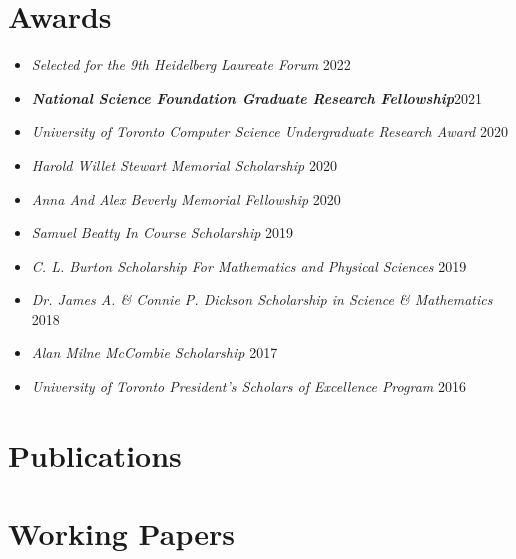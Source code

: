 \documentclass{article}
\begin{document}
    \section{Awards}
    \begin{itemize}
     \setlength\itemsep{.8ex}
     	\item \textsl{Selected for the 9th Heidelberg Laureate Forum} \hfill 2022
    	\item \textbf{\textsl{National Science Foundation Graduate Research Fellowship}}\hfill 2021
        \item \textsl{University of Toronto Computer Science Undergraduate Research Award} \hfill 2020
        \item \textsl{Harold Willet Stewart Memorial Scholarship} \hfill 2020
        \item \textsl{Anna And Alex Beverly Memorial Fellowship} \hfill 2020
        \item \textsl{Samuel Beatty In Course Scholarship} \hfill 2019
        \item \textsl{C. L. Burton Scholarship For Mathematics and Physical Sciences} \hfill 2019
        \item \textsl{Dr. James A. \& Connie P. Dickson Scholarship in Science \& Mathematics} \hfill 2018
        \item \textsl{Alan Milne McCombie Scholarship} \hfill 2017
        \item \textsl{University of Toronto President's Scholars of Excellence Program} \hfill 2016
    \end{itemize}


    \section{Publications}
    \begin{etaremune}
    	[itemsep=-.5ex,
    	leftmargin=3.5ex]
        
    \end{etaremune}
    
    \section{Working Papers}
    \begin{etaremune}
    	[itemsep=-.5ex,
    	leftmargin=3.5ex]
        
    \end{etaremune}
    
\end{document}
